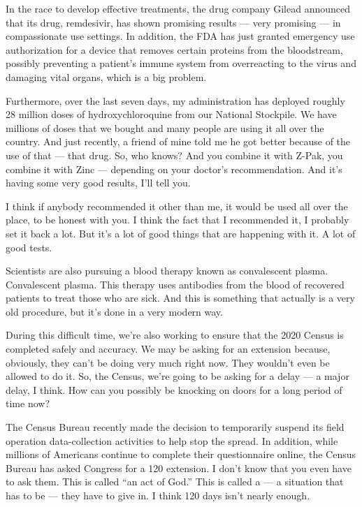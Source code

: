 In the race to develop effective treatments, the drug company Gilead
announced that its drug, remdesivir, has shown promising results ---
very promising --- in compassionate use settings. In addition, the FDA
has just granted emergency use authorization for a device that removes
certain proteins from the bloodstream, possibly preventing a patient's
immune system from overreacting to the virus and damaging vital organs,
which is a big problem.

Furthermore, over the last seven days, my administration has deployed
roughly 28 million doses of hydroxychloroquine from our National
Stockpile. We have millions of doses that we bought and many people are
using it all over the country. And just recently, a friend of mine told
me he got better because of the use of that --- that drug. So, who
knows? And you combine it with Z-Pak, you combine it with Zinc ---
depending on your doctor's recommendation. And it's having some very
good results, I'll tell you.

I think if anybody recommended it other than me, it would be used all
over the place, to be honest with you. I think the fact that I
recommended it, I probably set it back a lot. But it's a lot of good
things that are happening with it. A lot of good tests.

Scientists are also pursuing a blood therapy known as convalescent
plasma. Convalescent plasma. This therapy uses antibodies from the blood
of recovered patients to treat those who are sick. And this is something
that actually is a very old procedure, but it's done in a very modern
way.

During this difficult time, we're also working to ensure that the 2020
Census is completed safely and accuracy. We may be asking for an
extension because, obviously, they can't be doing very much right now.
They wouldn't even be allowed to do it. So, the Census, we're going to
be asking for a delay --- a major delay, I think. How can you possibly
be knocking on doors for a long period of time now?

The Census Bureau recently made the decision to temporarily suspend its
field operation data-collection activities to help stop the spread. In
addition, while millions of Americans continue to complete their
questionnaire online, the Census Bureau has asked Congress for a 120
extension. I don't know that you even have to ask them. This is called
``an act of God.'' This is called a --- a situation that has to be ---
they have to give in. I think 120 days isn't nearly enough.

